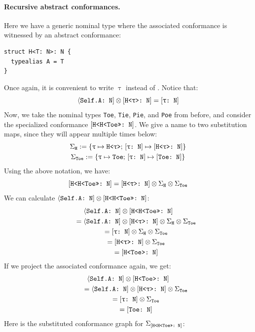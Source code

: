 \documentclass[../generics]{subfiles}
\begin{document}
\paragraph{Recursive abstract conformances.}
Here we have a generic nominal type where the associated conformance is witnessed by an abstract conformance:
\begin{Verbatim}
struct H<T: N>: N {
  typealias A = T
}
\end{Verbatim}
Once again, it is convenient to write $\uptau$ instead of \rT. Notice that:
\[\langle\texttt{Self.A:~N}] \otimes [\texttt{H<$\uptau$>:~N}] = [\texttt{$\uptau$:~N}]\]
Now, we take the nominal types \texttt{Toe}, \texttt{Tie}, \texttt{Pie}, and \texttt{Poe} from before, and consider the specialized conformance $[\texttt{H<H<Toe>>:~N}]$. We give a name to two substitution maps, since they will appear multiple times below:
\begin{gather*}
\Sigma_\texttt{H} := \{\texttt{$\uptau$} \mapsto \texttt{H<$\uptau$>};\,[\texttt{$\uptau$:~N}] \mapsto [\texttt{H<$\uptau$>:~N}]\}\\
\Sigma_\texttt{Toe} := \{\texttt{$\uptau$} \mapsto \texttt{Toe};\,[\texttt{$\uptau$:~N}] \mapsto [\texttt{Toe:~N}]\}
\end{gather*}
Using the above notation, we have:
\[[\texttt{H<H<Toe>>:~N}] = [\texttt{H<$\uptau$>:~N}]\otimes \Sigma_{\texttt{H}}\otimes \Sigma_{\texttt{Toe}}\]
We can calculate $\langle\texttt{Self.A:~N}]\otimes[\texttt{H<H<Toe>>:~N}]$:
\begin{gather*}
\langle\texttt{Self.A:~N}] \otimes [\texttt{H<H<Toe>>:~N}]\\
\qquad {} = \langle\texttt{Self.A:~N}] \otimes [\texttt{H<$\uptau$>:~N}] \otimes \Sigma_{\texttt{H}}\otimes \Sigma_{\texttt{Toe}} \\
\qquad {} = [\texttt{$\uptau$:~N}] \otimes \Sigma_{\texttt{H}}\otimes \Sigma_{\texttt{Toe}} \\
\qquad {} = [\texttt{H<$\uptau$>:~N}] \otimes \Sigma_{\texttt{Toe}}\\
\qquad {} = [\texttt{H<Toe>:~N}]
\end{gather*}
If we project the associated conformance again, we get:
\begin{gather*}
\langle\texttt{Self.A:~N}] \otimes [\texttt{H<Toe>:~N}]\\
\qquad {} = \langle\texttt{Self.A:~N}] \otimes [\texttt{H<$\uptau$>:~N}] \otimes \Sigma_{\texttt{Toe}}\\
\qquad {} = [\texttt{$\uptau$:~N}] \otimes \Sigma_{\texttt{Toe}}\\
\qquad {} = [\texttt{Toe:~N}]
\end{gather*}
Here is the substituted conformance graph for $\Sigma_{[\texttt{H<H<Toe>>:~N}]}$:

\smallskip
\end{document}
